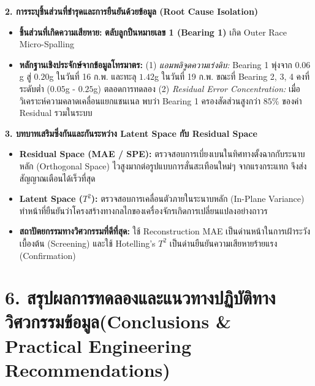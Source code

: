 \documentclass[12pt,a4paper]{article}
\begin{document}
\begin{ansbox}[unbreakable, fontupper={\fontsize{9.3pt}{12.0pt}\selectfont}, left=6pt, right=6pt, top=3pt, bottom=3pt]
\vspace{0.15em}
\noindent\textbf{\normalsize 2. การระบุชิ้นส่วนที่ชำรุดและการยืนยันด้วยข้อมูล (Root Cause Isolation)}\par\vspace{0.05em}
\begin{itemize}[leftmargin=1.2em, itemsep=0.5pt, topsep=0.5pt]
    \item \textbf{ชิ้นส่วนที่เกิดความเสียหาย:} \textbf{ตลับลูกปืนหมายเลข 1 (Bearing 1)} เกิด Outer Race Micro-Spalling
    \item \textbf{หลักฐานเชิงประจักษ์จากข้อมูลโทรมาตร:}
    (1) \textit{แอมพลิจูดความเร่งดิบ:} Bearing 1 พุ่งจาก $0.06$g สู่ $0.20$g ในวันที่ 16 ก.พ. และทะลุ $1.42$g ในวันที่ 19 ก.พ. ขณะที่ Bearing 2, 3, 4 คงที่ระดับต่ำ ($0.05$g - $0.25$g) ตลอดการทดลอง
    (2) \textit{Residual Error Concentration:} เมื่อวิเคราะห์ความคลาดเคลื่อนแยกแชนเนล พบว่า Bearing 1 ครองสัดส่วนสูงกว่า \textbf{$85\%$} ของค่า Residual รวมในระบบ
\end{itemize}

\vspace{0.15em}
\noindent\textbf{\normalsize 3. บทบาทเสริมซึ่งกันและกันระหว่าง Latent Space กับ Residual Space}\par\vspace{0.05em}
\begin{itemize}[leftmargin=1.2em, itemsep=0.5pt, topsep=0.5pt]
    \item \textbf{Residual Space (MAE / SPE):} ตรวจสอบการเบี่ยงเบนในทิศทางตั้งฉากกับระนาบหลัก (Orthogonal Space) ไวสูงมากต่อรูปแบบการสั่นสะเทือนใหม่ๆ จากแรงกระแทก จึงส่งสัญญาณเตือนได้เร็วที่สุด
    \item \textbf{Latent Space ($T^2$):} ตรวจสอบการเคลื่อนตัวภายในระนาบหลัก (In-Plane Variance) ทำหน้าที่ยืนยันว่าโครงสร้างทางกลไกของเครื่องจักรเกิดการเปลี่ยนแปลงอย่างถาวร
    \item \textbf{สถาปัตยกรรมทางวิศวกรรมที่ดีที่สุด:} ใช้ Reconstruction MAE เป็นด่านหน้าในการเฝ้าระวังเบื้องต้น (Screening) และใช้ Hotelling's $T^2$ เป็นด่านยืนยันความเสียหายร้ายแรง (Confirmation)
\end{itemize}
\end{ansbox}

\clearpage
\section*{6. สรุปผลการทดลองและแนวทางปฏิบัติทางวิศวกรรมข้อมูล\newline \large(Conclusions \& Practical Engineering Recommendations)}
\end{document}
